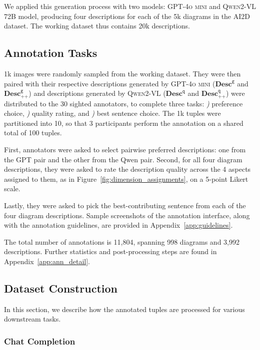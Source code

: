 We applied this generation process with two models: \textsc{GPT-4o mini} and \textsc{Qwen2-VL} 72B model, producing four descriptions for each of the 5k diagrams in the AI2D dataset. The working dataset thus contains 20k descriptions.

\subsection{Annotation Tasks}\label{sec:annot}

1k images were randomly sampled from the working dataset. They were then paired with their respective descriptions generated by \textsc{GPT-4o mini} ($\textbf{Desc}_{}^{\texttt{g}}$ and $\textbf{Desc}_{\texttt{++}}^{\texttt{g}}$) and descriptions generated by \textsc{Qwen2-VL} ($\textbf{Desc}_{}^{\texttt{q}}$ and $\textbf{Desc}_{\texttt{++}}^{\texttt{q}}$) were distributed to the 30 sighted annotators, to complete three tasks: \textit{)} preference choice, \textit{)} quality rating, and \textit{)} best sentence choice. The 1k tuples were partitioned into 10, so that 3 participants perform the annotation on a shared total of 100 tuples.

First, annotators were asked to select pairwise preferred descriptions: one from the GPT pair and the other from the Qwen pair. Second, for all four diagram descriptions, they were asked to rate the description quality across the 4 aspects assigned to them, as in Figure~\ref{fig:dimension_assignments}, on a 5-point Likert scale.

Lastly, they were asked to pick the best-contributing sentence from each of the four diagram descriptions. Sample screenshots of the annotation interface, along with the annotation guidelines, are provided in Appendix~\ref{app:guidelines}.

The total number of annotations is 11,804, spanning 998 diagrams and 3,992 descriptions. Further statistics and post-processing steps are found in Appendix~\ref{app:ann_detail}.


\subsection{Dataset Construction}
In this section, we describe how the annotated tuples are processed for various downstream tasks.

\subsubsection{Chat Completion} %

